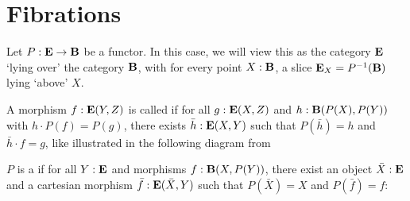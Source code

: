 \section{Fibrations}
Let $ P : \mathbf{E} \to \mathbf{B} $ be a functor. In this case, we will view this as the category $ \mathbf{E} $ `lying over' the category $ \mathbf{B} $, with for every point $ X: \mathbf{B} $, a slice $ \mathbf{E}_X = P^{-1}(\mathbf{B}) $ lying `above' $ X $.

\begin{definition}
  A morphism $ f: \mathbf{E}(Y, Z) $ is called  if for all $ g: \mathbf{E}(X, Z) $ and $ h: \mathbf{B}(P(X), P(Y)) $ with $ h \cdot P(f) = P(g) $, there exists $ \bar h: \mathbf{E}(X, Y) $ such that $ P(\bar h) = h $ and $ \bar h \cdot f = g $, like illustrated in the following diagram from \autocite{nlab:grothendieck_fibration}
  \begin{center}
  \end{center}
\end{definition}

\begin{definition}
  $ P $ is a  if for all $ Y: \mathbf{E} $ and morphisms $ f: \mathbf{B}(X, P(Y)) $, there exist an object $ \bar X: \mathbf{E} $ and a cartesian morphism $ \bar f: \mathbf{E}(\bar X, Y) $ such that $ P(\bar X) = X $ and $ P(\bar f) = f $:
  \begin{center}
  \end{center}
\end{definition}

